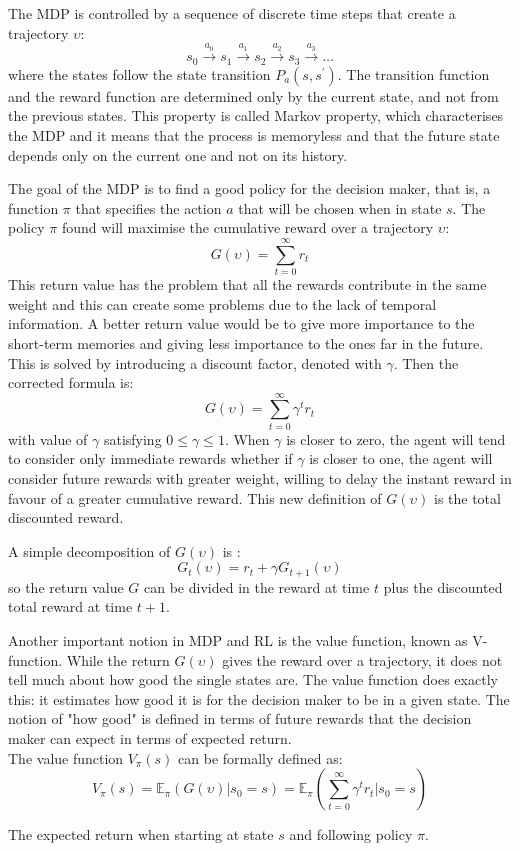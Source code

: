 The \gls{MDP} is controlled by a sequence of discrete time steps that create a trajectory $\upsilon$:
\[s_0 \xrightarrow{a_0} s_1 \xrightarrow{a_1} s_2 \xrightarrow{a_2} s_3 \xrightarrow{a_3} \dotso\]
where the states follow the state transition $P_a(s,s^\prime)$. The transition function and the reward function are determined only by the current state, and not from the previous states. This property is called Markov property, which characterises the MDP and it means that the process is memoryless and that the future state depends only on the current one and not on its history. 


The goal of the \gls{MDP} is to find a good policy for the decision maker, that is, a function $\pi$ that specifies the action $a$ that will be chosen when in state $s$. The policy $\pi$ found will maximise the cumulative reward over a trajectory $\upsilon$:
\[ G(\upsilon) = \sum_{t=0}^{\infty} r_t \] 
This return value has the problem that all the rewards contribute in the same weight and this can create some problems due to the lack of temporal information. A better return value would be to give more importance to the short-term memories and giving less importance to the ones far in the future. This is solved by introducing a discount factor, denoted with $\gamma$. Then the corrected formula is: 
\[ G(\upsilon) = \sum_{t=0}^{\infty} \gamma^t r_t \]
with value of $\gamma$ satisfying $ 0 \leq \gamma \leq 1$. When $\gamma$ is closer to zero, the agent will tend to consider only immediate rewards whether if $\gamma$ is closer to one, the agent will consider future rewards with greater weight, willing to delay the instant reward in favour of a greater cumulative reward. 
This new definition of $G(\upsilon)$ is the total discounted reward.

A simple decomposition of $G(\upsilon)$ is : 
\[ G_t(\upsilon) = r_t + \gamma G_{t+1}(\upsilon)\]
so the return value $G$ can be divided in the reward at time $t$ plus the discounted total reward at time $t+1$.


Another important notion in \gls{MDP} and \gls{RL} is the value function, known as V-function. While the return $G(\upsilon)$ gives the reward over a trajectory, it does not tell much about how good the single states are. The value function does exactly this: it estimates how good it is for the decision maker to be in a given state. The notion of "how good" is defined in terms of future rewards that the decision maker can expect in terms of expected return.
\\
The value function $V_{\pi}(s)$ can be formally defined as: 
\[V_{\pi}(s) = \mathbb{E}_{\pi}(G(\upsilon)|s_0=s) = \mathbb{E}_{\pi}(\sum_{t=0}^{\infty} \gamma^t r_t|s_0=s)\]
\vspace{-9.3mm}
\begin{center}
The expected return when starting at state $s$ and following policy $\pi$.
\end{center}

